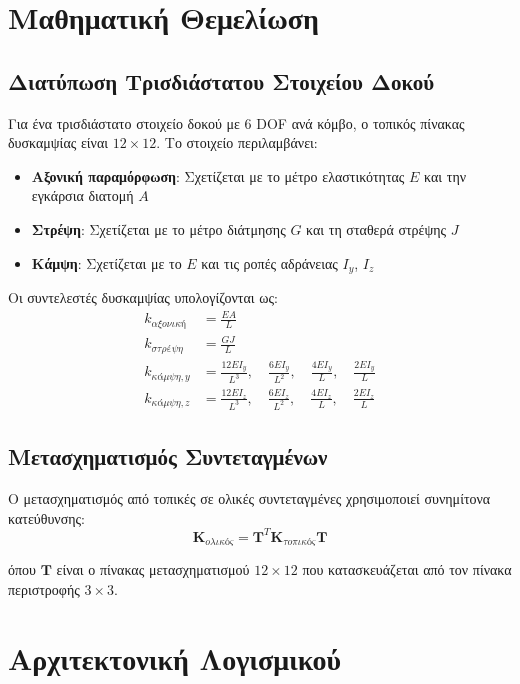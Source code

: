 \documentclass[12pt,a4paper]{article}
\begin{document}
\section{Μαθηματική Θεμελίωση}

\subsection{Διατύπωση Τρισδιάστατου Στοιχείου Δοκού}

Για ένα τρισδιάστατο στοιχείο δοκού με 6 DOF ανά κόμβο, ο τοπικός πίνακας δυσκαμψίας είναι $12 \times 12$. Το στοιχείο περιλαμβάνει:

\begin{itemize}
    \item \textbf{Αξονική παραμόρφωση}: Σχετίζεται με το μέτρο ελαστικότητας $E$ και την εγκάρσια διατομή $A$
    \item \textbf{Στρέψη}: Σχετίζεται με το μέτρο διάτμησης $G$ και τη σταθερά στρέψης $J$
    \item \textbf{Κάμψη}: Σχετίζεται με το $E$ και τις ροπές αδράνειας $I_y$, $I_z$
\end{itemize}

Οι συντελεστές δυσκαμψίας υπολογίζονται ως:
\begin{align}
k_{αξονική} &= \frac{EA}{L} \\
k_{στρέψη} &= \frac{GJ}{L} \\
k_{κάμψη,y} &= \frac{12EI_y}{L^3}, \quad \frac{6EI_y}{L^2}, \quad \frac{4EI_y}{L}, \quad \frac{2EI_y}{L} \\
k_{κάμψη,z} &= \frac{12EI_z}{L^3}, \quad \frac{6EI_z}{L^2}, \quad \frac{4EI_z}{L}, \quad \frac{2EI_z}{L}
\end{align}

\subsection{Μετασχηματισμός Συντεταγμένων}

Ο μετασχηματισμός από τοπικές σε ολικές συντεταγμένες χρησιμοποιεί συνημίτονα κατεύθυνσης:
\begin{equation}
\mathbf{K}_{ολικός} = \mathbf{T}^T \mathbf{K}_{τοπικός} \mathbf{T}
\end{equation}

όπου $\mathbf{T}$ είναι ο πίνακας μετασχηματισμού $12 \times 12$ που κατασκευάζεται από τον πίνακα περιστροφής $3 \times 3$.

\section{Αρχιτεκτονική Λογισμικού}
\end{document}

